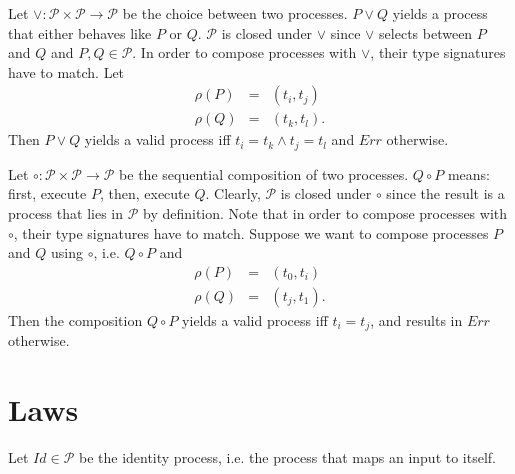 Let $\vee \colon \mathcal{P} \times \mathcal{P} \to \mathcal{P}$ be the choice between two processes. $P \vee Q$ yields a process that either behaves like $P$ or $Q$. $\mathcal{P}$ is closed under $\vee$ since $\vee$ selects between $P$ and $Q$ and $P, Q \in \mathcal{P}$. In order to compose processes with $\vee$, their type signatures have to match. Let
\begin{eqnarray*}
  \rho \left( P \right) & = & \left( t_i, t_j \right) \\
  \rho \left( Q \right) & = & \left( t_k, t_l \right).
\end{eqnarray*}
Then $P \vee Q$ yields a valid process iff $t_i = t_k \wedge t_j = t_l$ and $Err$ otherwise.

Let $\circ \colon \mathcal{P} \times \mathcal{P} \to \mathcal{P}$ be the sequential composition of two processes. $Q \circ P$ means: first, execute $P$, then, execute $Q$. Clearly, $\mathcal{P}$ is closed under $\circ$ since the result is a process that lies in $\mathcal{P}$ by definition. Note that in order to compose processes with $\circ$, their type signatures have to match. Suppose we want to compose processes $P$ and $Q$ using $\circ$, i.e. $Q \circ P$ and
\begin{eqnarray*}
  \rho \left( P \right) & = & \left( t_0, t_i \right) \\
  \rho \left( Q \right) & = & \left( t_j, t_1 \right).
\end{eqnarray*}
Then the composition $Q \circ P$ yields a valid process iff $t_i = t_j$, and results in $Err$ otherwise. 

\section{Laws}
Let $Id \in \mathcal{P}$ be the identity process, i.e. the process that maps an input to itself.